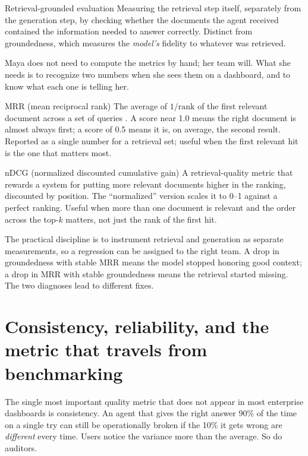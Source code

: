 \begin{TNdefinition}{Retrieval-grounded evaluation}
Measuring the retrieval step itself, separately from the generation step, by checking whether the documents the agent received contained the information needed to answer correctly. Distinct from groundedness, which measures the \textit{model's} fidelity to whatever was retrieved.
\end{TNdefinition}

Maya does not need to compute the metrics by hand; her team will. What she needs is to recognize two numbers when she sees them on a dashboard, and to know what each one is telling her.

\begin{TNdefinition}{MRR (mean reciprocal rank)}
The average of $1/\textrm{rank}$ of the first relevant document across a set of queries \citep{voorhees1998trec}. A score near 1.0 means the right document is almost always first; a score of 0.5 means it is, on average, the second result. Reported as a single number for a retrieval set; useful when the first relevant hit is the one that matters most.
\end{TNdefinition}

\begin{TNdefinition}{nDCG (normalized discounted cumulative gain)}
A retrieval-quality metric \citep{jarvelin2002ndcg} that rewards a system for putting more relevant documents higher in the ranking, discounted by position. The ``normalized'' version scales it to 0--1 against a perfect ranking. Useful when more than one document is relevant and the order across the top-$k$ matters, not just the rank of the first hit.
\end{TNdefinition}

The practical discipline is to instrument retrieval and generation as separate measurements, so a regression can be assigned to the right team. A drop in groundedness with stable MRR means the model stopped honoring good context; a drop in MRR with stable groundedness means the retrieval started missing. The two diagnoses lead to different fixes.

\section{Consistency, reliability, and the metric that travels from benchmarking}

The single most important quality metric that does not appear in most enterprise dashboards is consistency. An agent that gives the right answer 90\% of the time on a single try can still be operationally broken if the 10\% it gets wrong are \textit{different} every time. Users notice the variance more than the average. So do auditors.

